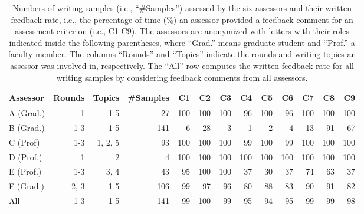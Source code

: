 \begin{table}[]
    \centering
    \small
    \begin{tabular}{lrrrrrrrrrrrr}
    \toprule
    Assessor & Rounds & Topics & \#Samples &    C1 &    C2 &    C3 &    C4 &    C5 &    C6 &    C7 &    C8 &    C9 \\
    \midrule
    A (Grad.) &  1 & 1-5  &  27 &  100 &  100 &  100 &   96 &  100 &   96 &  100 &  100 &  100 \\
    B (Grad.) &   1-3 & 1-5 &   141 &    6 &   28 &    3 &    1 &    2 &    4 &   13 &   91 &   67 \\
    C (Prof) & 1-3 & 1, 2, 5 &  93 &  100 &  100 &  100 &   99 &  100 &   99 &  100 &  100 &  100 \\
    D (Prof.) &  1 & 2 &  4 &  100 &  100 &  100 &  100 &  100 &  100 &  100 &  100 &  100 \\
    E (Prof.) &  1-3 & 3, 4 &  43 &   95 &  100 &  100 &   37 &   30 &   37 &   74 &   63 &   37 \\
    F (Grad.) &  2, 3 & 1-5 & 106 &   99 &   97 &   96 &   80 &   88 &   83 &   90 &   91 &   82 \\
    All &  1-3 & 1-5 &    141 &   99 &  100 &   99 &   95 &   94 &   95 &   99 &   99 &   98 \\
    \bottomrule
    \end{tabular}
    
    \caption{Numbers of writing samples (i.e., ``\#Samples'') assessed by the six assessors and their written feedback rate, i.e., the percentage of time (\%) an assessor provided a feedback comment for an assessment criterion (i.e., C1-C9). The assessors are anonymized with letters with their roles indicated inside the following parentheses, where ``Grad.'' means graduate student and ``Prof.'' a faculty member. The columns ``Rounds'' and ``Topics'' indicate the rounds and writing topics an assessor was involved in, respectively. The ``All'' row computes the written feedback rate for all writing samples by considering feedback comments from all assessors. }
    \label{tab:feedbackRate}
\end{table}